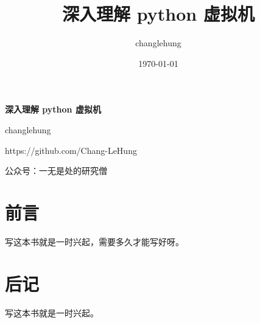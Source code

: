 \documentclass[11pt]{book}
\title{\textbf{深入理解 python 虚拟机}}
\author{changlehung \affil{单位1}}
\date{\today}
\theoremstyle{mytheoremstyle}
\begin{document}
\begin{titlepage}
    \begin{center}
        \vspace{3cm}
        {\Huge\textbf{深入理解 python 虚拟机}}
        
        \vspace{1cm}
        {\Large{changlehung}}
        
        \vspace{1cm}
        {\large{https://github.com/Chang-LeHung}}
    
        \vspace{3cm}
        {\Large{公众号：一无是处的研究僧}}
    \end{center}
\end{titlepage}



\tableofcontents

\frontmatter %

\chapter{前言}
写这本书就是一时兴起，需要多久才能写好呀。

\mainmatter %



\backmatter %

\chapter{后记}
写这本书就是一时兴起。
\end{document}
